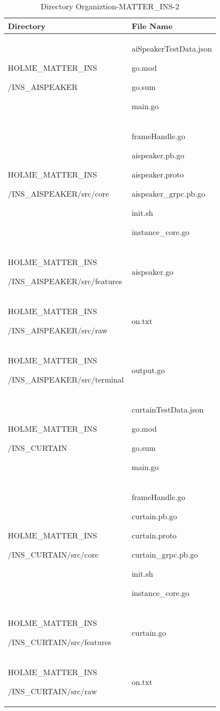 \documentclass[conference]{IEEEtran}
\begin{document}
\begin{table}[h]
\caption{Directory Organiztion-MATTER\_INS-2}
\def\arraystretch{1.24} \small
    \begin{tabular}{|p{3.9cm}|p{3.9cm}|}
        \hline
        Directory & File Name \\ \hline
          HOLME\_MATTER\_INS\par/INS\_AISPEAKER & aiSpeakerTestData.json\par go.mod\par go.sum\par main.go\\ \hline
          HOLME\_MATTER\_INS\par/INS\_AISPEAKER/src/core & frameHandle.go\par aispeaker.pb.go\par aispeaker.proto\par aispeaker\_grpc.pb.go\par init.sh\par instance\_core.go\\ \hline
          HOLME\_MATTER\_INS\par/INS\_AISPEAKER/src/features& aispeaker.go\\ \hline
          HOLME\_MATTER\_INS\par/INS\_AISPEAKER/src/raw& on.txt\\ \hline
          HOLME\_MATTER\_INS\par/INS\_AISPEAKER/src/terminal& output.go\\ \hline
          HOLME\_MATTER\_INS\par/INS\_CURTAIN & curtainTestData.json\par go.mod\par go.sum\par main.go\\ \hline
          HOLME\_MATTER\_INS\par/INS\_CURTAIN/src/core & frameHandle.go\par curtain.pb.go\par curtain.proto\par curtain\_grpc.pb.go\par init.sh\par instance\_core.go\\ \hline
          HOLME\_MATTER\_INS\par/INS\_CURTAIN/src/features& curtain.go\\ \hline
          HOLME\_MATTER\_INS\par/INS\_CURTAIN/src/raw& on.txt\\ \hline

\end{tabular}
\end{table}
\end{document}
